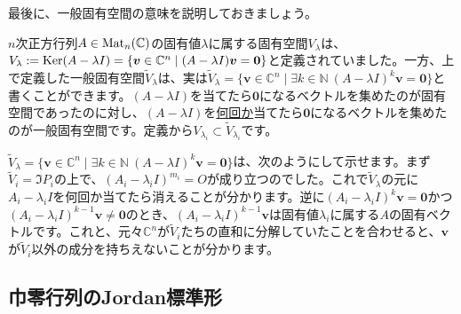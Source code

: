 最後に、一般固有空間の意味を説明しておきましょう。

$n$次正方行列$A \in \operatorname{Mat}_n(\mathbb{C})$の固有値$\lambda$に属する固有空間$V_{\lambda}$は、$V_{\lambda} := \operatorname{Ker} (A - \lambda I) = \{\boldsymbol{v} \in \mathbb{C}^n \mid (A - \lambda I)\boldsymbol{v} = \boldsymbol{0}\}$と定義されていました。一方、上で定義した一般固有空間$\tilde{V}_{\lambda}$は、実は$\tilde{V}_{\lambda} = \{\bm{v} \in \mathbb{C}^n \mid \exists k \in \mathbb{N}\  (A - \lambda I)^k \bm{v} = \bm{0}\}$と書くことができます。$(A - \lambda I)$を当てたら$\bm{0}$になるベクトルを集めたのが固有空間であったのに対し、$(A - \lambda I)$を\uline{何回か}当てたら$\bm{0}$になるベクトルを集めたのが一般固有空間です。定義から$V_{\lambda_i} \subset \tilde{V}_{\lambda_i}$です。

$\tilde{V}_{\lambda} = \{\bm{v} \in \mathbb{C}^n \mid \exists k \in \mathbb{N}\  (A - \lambda I)^k \bm{v} = \bm{0}\}$は、次のようにして示せます。まず$\tilde{V}_i = \Im P_i$の上で、$(A_i - \lambda_i I)^{m_i} = O$が成り立つのでした。これで$\tilde{V}_{\lambda}$の元に$A_i - \lambda_i I$を何回か当てたら消えることが分かります。逆に$(A_i - \lambda_i I)^k \bm{v} = \bm{0}$かつ$(A_i - \lambda_i I)^{k - 1} \bm{v} \neq \bm{0}$のとき、$(A_i - \lambda_i I)^{k - 1} \bm{v}$は固有値$\lambda_i$に属する$A$の固有ベクトルです。これと、元々$\mathbb{C}^n$が$\tilde{V}_i$たちの直和に分解していたことを合わせると、$\bm{v}$が$\tilde{V}_i$以外の成分を持ちえないことが分かります。

\subsection{巾零行列のJordan標準形}

